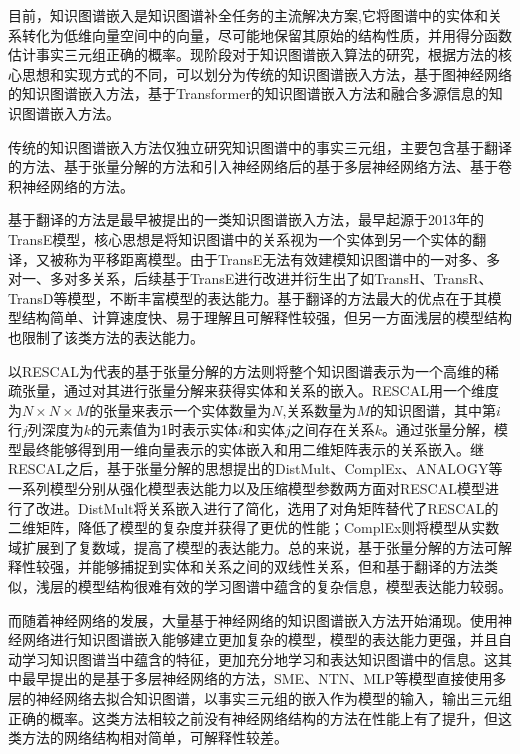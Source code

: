 目前，知识图谱嵌入是知识图谱补全任务的主流解决方案,它将图谱中的实体和关系转化为低维向量空间中的向量，尽可能地保留其原始的结构性质，并用得分函数估计事实三元组正确的概率。现阶段对于知识图谱嵌入算法的研究，根据方法的核心思想和实现方式的不同，可以划分为传统的知识图谱嵌入方法，基于图神经网络的知识图谱嵌入方法，基于Transformer的知识图谱嵌入方法和融合多源信息的知识图谱嵌入方法。

传统的知识图谱嵌入方法仅独立研究知识图谱中的事实三元组，主要包含基于翻译的方法、基于张量分解的方法和引入神经网络后的基于多层神经网络方法、基于卷积神经网络的方法。

基于翻译的方法是最早被提出的一类知识图谱嵌入方法，最早起源于2013年的TransE模型，核心思想是将知识图谱中的关系视为一个实体到另一个实体的翻译，又被称为平移距离模型。由于TransE无法有效建模知识图谱中的一对多、多对一、多对多关系，后续基于TransE进行改进并衍生出了如TransH、TransR、TransD等模型，不断丰富模型的表达能力。基于翻译的方法最大的优点在于其模型结构简单、计算速度快、易于理解且可解释性较强，但另一方面浅层的模型结构也限制了该类方法的表达能力。

以RESCAL为代表的基于张量分解的方法则将整个知识图谱表示为一个高维的稀疏张量，通过对其进行张量分解来获得实体和关系的嵌入。RESCAL用一个维度为$N\times N\times M$的张量来表示一个实体数量为$N$,关系数量为$M$的知识图谱，其中第$i$行$j$列深度为$k$的元素值为1时表示实体$i$和实体$j$之间存在关系$k$。通过张量分解，模型最终能够得到用一维向量表示的实体嵌入和用二维矩阵表示的关系嵌入。继RESCAL之后，基于张量分解的思想提出的DistMult、ComplEx、ANALOGY等一系列模型分别从强化模型表达能力以及压缩模型参数两方面对RESCAL模型进行了改进。DistMult将关系嵌入进行了简化，选用了对角矩阵替代了RESCAL的二维矩阵，降低了模型的复杂度并获得了更优的性能；ComplEx则将模型从实数域扩展到了复数域，提高了模型的表达能力。总的来说，基于张量分解的方法可解释性较强，并能够捕捉到实体和关系之间的双线性关系，但和基于翻译的方法类似，浅层的模型结构很难有效的学习图谱中蕴含的复杂信息，模型表达能力较弱。

而随着神经网络的发展，大量基于神经网络的知识图谱嵌入方法开始涌现。使用神经网络进行知识图谱嵌入能够建立更加复杂的模型，模型的表达能力更强，并且自动学习知识图谱当中蕴含的特征，更加充分地学习和表达知识图谱中的信息。这其中最早提出的是基于多层神经网络的方法，SME、NTN、MLP等模型直接使用多层的神经网络去拟合知识图谱，以事实三元组的嵌入作为模型的输入，输出三元组正确的概率。这类方法相较之前没有神经网络结构的方法在性能上有了提升，但这类方法的网络结构相对简单，可解释性较差。

